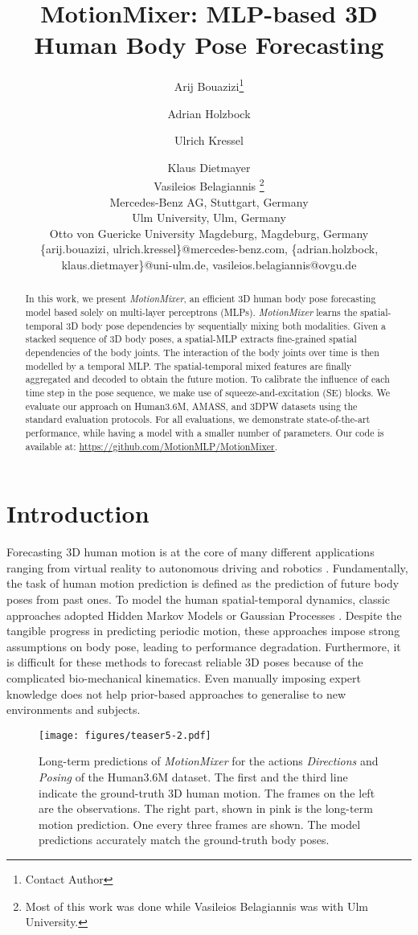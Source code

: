 \documentclass{article}
\title{MotionMixer: MLP-based 3D Human Body Pose Forecasting}
\author{
Arij Bouazizi\footnote{Contact Author}\and
Adrian Holzbock\and
Ulrich Kressel \and
Klaus Dietmayer\And
\\ Vasileios Belagiannis \footnote{Most of this work was done while Vasileios Belagiannis was with Ulm University.} \\
\affiliations
Mercedes-Benz AG, Stuttgart, Germany\\
Ulm University, Ulm, Germany\\
Otto von Guericke University Magdeburg, Magdeburg, Germany\\
\emails
\{arij.bouazizi, ulrich.kressel\}@mercedes-benz.com,
\{adrian.holzbock, klaus.dietmayer\}@uni-ulm.de,
vasileios.belagiannis@ovgu.de
}
\begin{document}
\maketitle

\begin{abstract}
In this work, we present \textit{MotionMixer}, an efficient 3D human body pose forecasting model based solely on multi-layer perceptrons (MLPs). \textit{MotionMixer} learns the spatial-temporal 3D body pose dependencies by sequentially mixing both modalities. Given a stacked sequence of 3D body poses, a spatial-MLP extracts fine-grained spatial dependencies of the body joints. The interaction of the body joints over time is then modelled by a temporal MLP. The spatial-temporal mixed features are finally aggregated and decoded to obtain the future motion. To calibrate the influence of each time step in the pose sequence, we  make use of squeeze-and-excitation (SE) blocks. We evaluate our approach on Human3.6M, AMASS, and 3DPW datasets using the standard evaluation protocols. For all evaluations, we demonstrate state-of-the-art performance, while having a model with a smaller number of parameters.  Our code is available at: \url{https://github.com/MotionMLP/MotionMixer}.
\end{abstract}


\section{Introduction}
Forecasting 3D human motion is at the core of many different applications ranging from virtual reality to autonomous driving \cite {wiederer2020traffic} and robotics \cite{gui2018teaching}. Fundamentally, the task of human motion prediction is defined as the prediction of future body poses from past ones. To model the human spatial-temporal dynamics, classic approaches adopted Hidden Markov Models \cite{kulic2012incremental} or Gaussian Processes \cite{wang2007gaussian}. Despite the tangible progress in predicting periodic motion, these approaches impose strong assumptions on body pose, leading to performance degradation. Furthermore, it is difficult for these methods to forecast reliable 3D poses because of  the complicated bio-mechanical kinematics. Even manually imposing expert knowledge does not help prior-based approaches to generalise to new environments and subjects.

\begin{figure} [ht!]
    \centering
    \texttt{[image: figures/teaser5-2.pdf]} 
    \caption{Long-term predictions of \textit{MotionMixer} for the actions \textit{Directions} and \textit{Posing}  of the Human3.6M dataset. The first and the third line indicate the ground-truth 3D human motion. The frames on the left are the observations. The right part, shown in pink is the long-term motion prediction. One every three frames are shown. The model predictions accurately match the ground-truth body poses.}
    \label{fig:teaser}
\end{figure}
\end{document}
